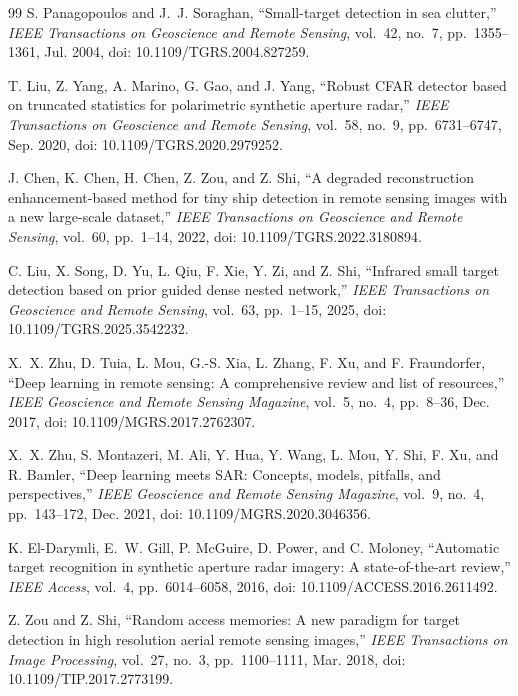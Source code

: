 \documentclass[journal]{IEEEtran}
\begin{document}
\begin{thebibliography}{99}
S. Panagopoulos and J.~J. Soraghan, ``Small-target detection in sea clutter,'' \emph{IEEE Transactions on Geoscience and Remote Sensing}, vol.~42, no.~7, pp.~1355--1361, Jul. 2004, doi: 10.1109/TGRS.2004.827259.

T. Liu, Z. Yang, A. Marino, G. Gao, and J. Yang, ``Robust CFAR detector based on truncated statistics for polarimetric synthetic aperture radar,'' \emph{IEEE Transactions on Geoscience and Remote Sensing}, vol.~58, no.~9, pp.~6731--6747, Sep. 2020, doi: 10.1109/TGRS.2020.2979252.

J. Chen, K. Chen, H. Chen, Z. Zou, and Z. Shi, ``A degraded reconstruction enhancement-based method for tiny ship detection in remote sensing images with a new large-scale dataset,'' \emph{IEEE Transactions on Geoscience and Remote Sensing}, vol.~60, pp.~1--14, 2022, doi: 10.1109/TGRS.2022.3180894.

C. Liu, X. Song, D. Yu, L. Qiu, F. Xie, Y. Zi, and Z. Shi, ``Infrared small target detection based on prior guided dense nested network,'' \emph{IEEE Transactions on Geoscience and Remote Sensing}, vol.~63, pp.~1--15, 2025, doi: 10.1109/TGRS.2025.3542232.

X.~X. Zhu, D. Tuia, L. Mou, G.-S. Xia, L. Zhang, F. Xu, and F. Fraundorfer, ``Deep learning in remote sensing: A comprehensive review and list of resources,'' \emph{IEEE Geoscience and Remote Sensing Magazine}, vol.~5, no.~4, pp.~8--36, Dec. 2017, doi: 10.1109/MGRS.2017.2762307.

X.~X. Zhu, S. Montazeri, M. Ali, Y. Hua, Y. Wang, L. Mou, Y. Shi, F. Xu, and R. Bamler, ``Deep learning meets SAR: Concepts, models, pitfalls, and perspectives,'' \emph{IEEE Geoscience and Remote Sensing Magazine}, vol.~9, no.~4, pp.~143--172, Dec. 2021, doi: 10.1109/MGRS.2020.3046356.

K. El-Darymli, E.~W. Gill, P. McGuire, D. Power, and C. Moloney, ``Automatic target recognition in synthetic aperture radar imagery: A state-of-the-art review,'' \emph{IEEE Access}, vol.~4, pp.~6014--6058, 2016, doi: 10.1109/ACCESS.2016.2611492.

Z. Zou and Z. Shi, ``Random access memories: A new paradigm for target detection in high resolution aerial remote sensing images,'' \emph{IEEE Transactions on Image Processing}, vol.~27, no.~3, pp.~1100--1111, Mar. 2018, doi: 10.1109/TIP.2017.2773199.


\end{thebibliography}
\end{document}
